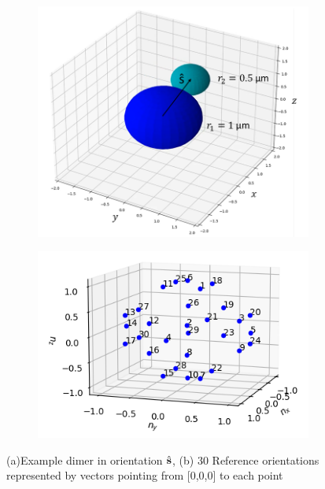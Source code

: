 \begin{figure}[h!]
	\centering
	\begin{subfigure}{0.49\textwidth}
		\subcaption{}
		\includegraphics[width=\textwidth]{fig2a.png}
	\end{subfigure}
	\begin{subfigure}{0.49\textwidth}
		\subcaption{}
		\includegraphics[width=\textwidth]{fig2b.png}
	\end{subfigure}
	\caption{(a)Example dimer in orientation $\hat{\bf s}$, (b) 30 Reference orientations represented by vectors pointing from [0,0,0] to each point}
	\label{fig:dimer}
\end{figure}


